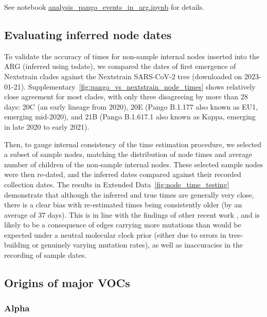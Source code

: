 \documentclass[12pt]{article}
\newcommand{\edref}[1]{Extended Data~\ref{#1}}
\newcommand{\siref}[1]{Supplementary~\ref{#1}}
\begin{document}
See notebook
\href{https://github.com/jeromekelleher/sc2ts-paper/blob/main/notebooks/analysis\_pango\_events\_in\_arg.ipynb}
{analysis\_pango\_events\_in\_arg.ipynb}
for details.


\subsection{Evaluating inferred node dates}
\label{sec:evaluating_node_dates}

To validate the accuracy of times for non-sample internal nodes
inserted into the ARG (inferred using tsdate),
we compared the dates of first emergence of
Nextstrain clades against the Nextstrain SARS-CoV-2 tree
(downloaded on 2023-01-21).
\siref{fig:pango_vs_nextstrain_node_times} shows
relatively close agreement for most clades,
with only three disagreeing by more than 28 days:
20C (an early lineage from 2020),
20E (Pango B.1.177 also known as EU1, emerging mid-2020), and
21B (Pango B.1.617.1 also known as Kappa, emerging in late 2020 to early 2021).

Then, to gauge internal consistency of the time estimation procedure,
we selected a subset of sample nodes,
matching the distribution of node times  and
average number of children of the non-sample internal nodes.
These selected sample nodes were then re-dated, and
the inferred dates compared against their recorded collection dates.
The results in \edref{fig:node_time_testing} demonstrate that
although the inferred and true times are generally very close,
there is a clear bias with re-estimated times
being consistently older (by an average of 37 days).
This is in line with the findings of
other recent work \cite{sanderson2021chronumental}, and
is likely to be a consequence of edges
carrying more mutations than would be expected
under a neutral molecular clock prior
(either due to errors in tree-building or genuinely varying mutation rates),
as well as inaccuracies in the recording of sample dates.

\subsection{Origins of major VOCs}

\subsubsection{Alpha}
\label{sec:dd_alpha}
\end{document}
